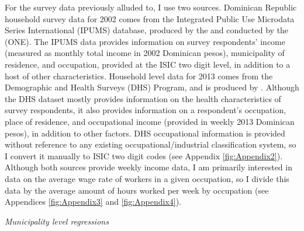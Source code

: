 \documentclass[12pt]{article}
\begin{document}
For the survey data previously alluded to, I use two sources. 
Dominican Republic household survey data for 2002 comes from the 
Integrated Public Use Microdata Series International
(IPUMS) database, produced by the \citet{ipumsi} and conducted by the
\citet{one} (ONE). The IPUMS data provides information on 
survey respondents' income (measured as monthly total income in
2002 Dominican pesos), municipality of residence, and occupation,
provided at the ISIC two digit level, in addition to a host of other characteristics.
Household level data for 2013 comes from the 
Demographic and Health Surveys (DHS) Program, and is produced by \citet{dhs}.
Although the DHS dataset mostly provides information on the health 
characteristics of survey respondents, it also provides 
information on a respondent's occupation, place of residence,
and occupational income (provided in weekly 2013 Dominican pesos), in addition to other factors. 
DHS occupational information is provided without reference to any existing occupational/industrial 
classification system, so I convert it manually to
ISIC two digit codes (see Appendix \ref{fig:Appendix2}).
Although both sources provide weekly income data, I am primarily interested in data
on the average wage rate of workers in a given occupation, so I divide this data by the average 
amount of hours worked per week by occupation (see Appendices \ref{fig:Appendix3} and 
\ref{fig:Appendix4}). %

\textit{Municipality level regressions}
\end{document}
